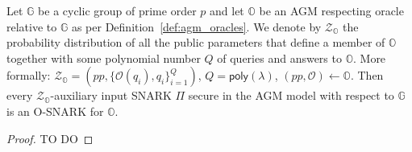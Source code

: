 \begin{theorem}
\label{the:when_osnarks} 
Let $\mathbb{G}$ be a cyclic group of prime order $p$ and let $\mathbb{O}$ be an AGM respecting oracle 
relative to $\mathbb{G}$ as per Definition~\ref{def:agm_oracles}. We denote by $\mathcal{Z}_{\mathbb{O}}$ the 
probability distribution of all the public parameters that define a member of $\mathbb{O}$ together with some 
polynomial number $Q$ of queries and answers to $\mathbb{O}$. More formally: 
$\mathcal{Z}_{\mathbb{O}} = (\mathit{pp}, \{\mathcal{O}(q_i), q_i\}_{i=1}^Q)$, $Q = \mathsf{poly}(\lambda)$, $(\mathit{pp}, \mathcal{O}) \leftarrow \mathbb{O}$. 
Then every $\mathcal{Z}_{\mathbb{O}}$-auxiliary input SNARK $\Pi$ secure in the AGM model with respect to $\mathbb{G}$ is an O-SNARK for $\mathbb{O}$.
\end{theorem}

\begin{proof}{\color{red} TO DO}
\end{proof}


